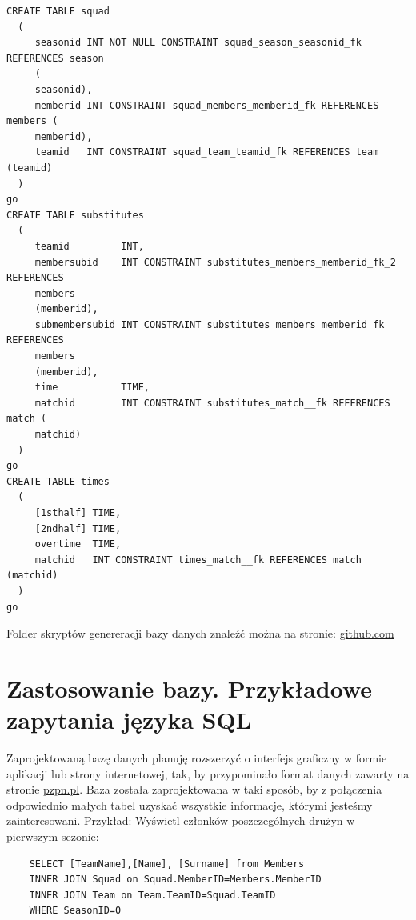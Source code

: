 \documentclass{article}
\begin{document}
\newpage
\begin{verbatim}
CREATE TABLE squad 
  ( 
     seasonid INT NOT NULL CONSTRAINT squad_season_seasonid_fk REFERENCES season 
     ( 
     seasonid), 
     memberid INT CONSTRAINT squad_members_memberid_fk REFERENCES members ( 
     memberid), 
     teamid   INT CONSTRAINT squad_team_teamid_fk REFERENCES team (teamid) 
  ) 
go 
CREATE TABLE substitutes 
  ( 
     teamid         INT, 
     membersubid    INT CONSTRAINT substitutes_members_memberid_fk_2 REFERENCES 
     members 
     (memberid), 
     submembersubid INT CONSTRAINT substitutes_members_memberid_fk REFERENCES 
     members 
     (memberid), 
     time           TIME, 
     matchid        INT CONSTRAINT substitutes_match__fk REFERENCES match ( 
     matchid) 
  ) 
go 
CREATE TABLE times 
  ( 
     [1sthalf] TIME, 
     [2ndhalf] TIME, 
     overtime  TIME, 
     matchid   INT CONSTRAINT times_match__fk REFERENCES match (matchid) 
  ) 
go 
\end{verbatim}
Folder skryptów genereracji bazy danych znaleźć można na stronie: \url{github.com}
\newpage
\section{Zastosowanie bazy. Przykładowe zapytania języka SQL}
Zaprojektowaną bazę danych planuję rozszerzyć o interfejs graficzny w formie aplikacji lub strony internetowej, tak, by przypominało format danych zawarty na stronie \url{pzpn.pl}.
Baza została zaprojektowana w taki sposób, by z połączenia odpowiednio małych tabel uzyskać wszystkie informacje, którymi jesteśmy zainteresowani.
\newline
Przykład: Wyświetl członków poszczególnych drużyn w pierwszym sezonie:
\begin{verbatim}
    SELECT [TeamName],[Name], [Surname] from Members
    INNER JOIN Squad on Squad.MemberID=Members.MemberID
    INNER JOIN Team on Team.TeamID=Squad.TeamID
    WHERE SeasonID=0
\end{verbatim}

\end{document}

